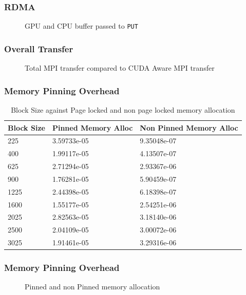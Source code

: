 \documentclass{beamer}
\begin{document}
\begin{frame}[fragile]
  \frametitle{RDMA}
  \pause
  \begin{figure}[h]
    \resizebox{.9\linewidth}{!}{}
    \caption{GPU and CPU buffer passed to \texttt{PUT}}
  \end{figure}
\end{frame}

\begin{frame}[fragile]
  \frametitle{Overall Transfer}
  \pause
  \begin{figure}[h]
    \resizebox{.9\linewidth}{!}{}
    \caption{Total MPI transfer compared to CUDA Aware MPI transfer}
  \end{figure}
\end{frame}
\begin{frame}[fragile]
  \frametitle{Memory Pinning Overhead}
  \begin{table}[h]
    \centering
    \begin{tabular}{l<{\onslide<2->} | l<{\onslide<3->} | l<{\onslide}}
      \hline
      Block Size & Pinned Memory Alloc & Non Pinned Memory Alloc \\
      \hline
      225        & 3.59733e-05         & 9.35048e-07             \\
      400        & 1.99117e-05         & 4.13507e-07             \\
      625        & 2.71294e-05         & 2.93367e-06             \\
      900        & 1.76281e-05         & 5.90459e-07             \\
      1225       & 2.44398e-05         & 6.18398e-07             \\
      1600       & 1.55177e-05         & 2.54251e-06             \\
      2025       & 2.82563e-05         & 3.18140e-06             \\
      2500       & 2.04109e-05         & 3.00072e-06             \\
      3025       & 1.91461e-05         & 3.29316e-06             \\
      \hline
    \end{tabular}
    \caption{Block Size against Page locked and non page locked memory allocation}
  \end{table}
\end{frame}

\begin{frame}[fragile]
  \frametitle{Memory Pinning Overhead}
  \begin{figure}[h]
    \resizebox{.9\linewidth}{!}{}
    \caption{Pinned and non Pinned memory allocation}
  \end{figure}
\end{frame}
\end{document}
